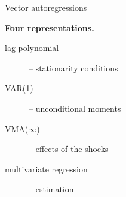 \documentclass[notes,blackandwhite,mathsans,usenames,dvipsnames]{beamer}
\begin{document}
{
\begin{frame}{Vector autoregressions}

\textbf{Four representations.}

\smallskip\begin{description}
\item[lag polynomial] {\color{mcxs2}-- stationarity conditions}
\item[VAR(1)] {\color{mcxs2}-- unconditional moments}
\item[VMA($\infty$)] {\color{mcxs2}-- effects of the shocks}
\item[multivariate regression] {\color{mcxs2}-- estimation}
\end{description}
\end{frame}
}
\end{document}
